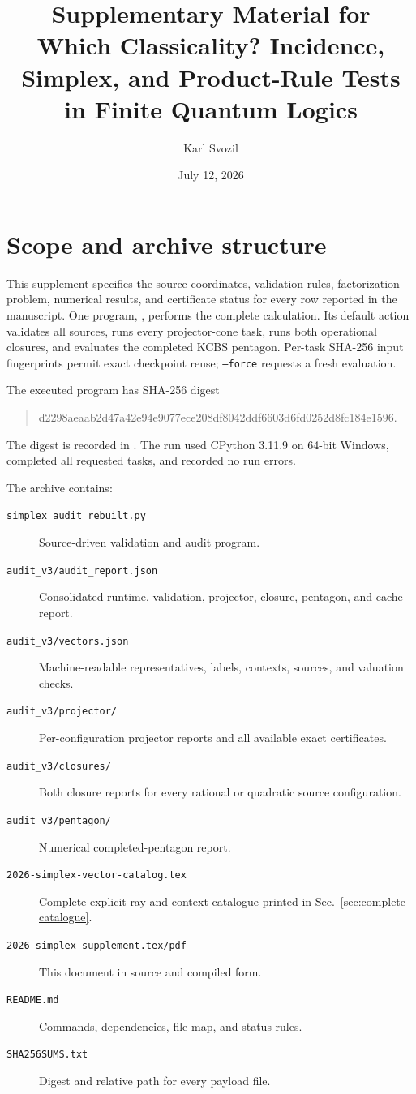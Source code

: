 \documentclass[11pt]{article}
\title{Supplementary Material for\\
Which Classicality? Incidence, Simplex, and Product-Rule Tests in Finite Quantum Logics}
\author{Karl Svozil}
\date{July 12, 2026}
\begin{document}
\maketitle

\section{Scope and archive structure}

This supplement specifies the source coordinates, validation rules,
factorization problem, numerical results, and certificate status for every row
reported in the manuscript.  One program,
, performs the complete calculation.  Its
default action validates all sources, runs every projector-cone task, runs both
operational closures, and evaluates the completed KCBS pentagon.  Per-task
SHA-256 input fingerprints permit exact checkpoint reuse; \texttt{--force}
requests a fresh evaluation.

The executed program has SHA-256 digest
\begin{quote}\small\ttfamily
d2298aeaab2d47a42e94e9077ece208df8042ddf6603d6fd0252d8fc184e1596.
\end{quote}
The digest is recorded in .  The run used
CPython 3.11.9 on 64-bit Windows, completed all requested tasks, and recorded no
run errors.

The archive contains:
\begin{description}
\item[\texttt{simplex\_audit\_rebuilt.py}] Source-driven validation and audit
program.
\item[\texttt{audit\_v3/audit\_report.json}] Consolidated runtime, validation,
projector, closure, pentagon, and cache report.
\item[\texttt{audit\_v3/vectors.json}] Machine-readable representatives,
labels, contexts, sources, and valuation checks.
\item[\texttt{audit\_v3/projector/}] Per-configuration projector reports and
all available exact certificates.
\item[\texttt{audit\_v3/closures/}] Both closure reports for every rational or
quadratic source configuration.
\item[\texttt{audit\_v3/pentagon/}] Numerical completed-pentagon report.
\item[\texttt{2026-simplex-vector-catalog.tex}] Complete explicit ray and
context catalogue printed in Sec.~\ref{sec:complete-catalogue}.
\item[\texttt{2026-simplex-supplement.tex/pdf}] This document in source and
compiled form.
\item[\texttt{README.md}] Commands, dependencies, file map, and status rules.
\item[\texttt{SHA256SUMS.txt}] Digest and relative path for every payload
file.
\end{description}
\end{document}
